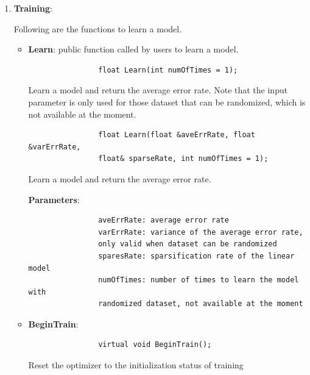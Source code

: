 \documentclass[11pt,a4paper]{article}
\newlength{\wideitemsep}
\let\olditem\item
\renewcommand{\item}{\setlength{\itemsep}{\wideitemsep}\olditem}
\begin{document}
\begin{enumerate}
    \item \textbf{Training}:

        Following are the functions to learn a model.

        \begin{itemize}
            \item \textbf{Learn}: public function called by users to learn a
                model.
                \lstset{language=C++,
                    framexleftmargin=-2.8cm,
                    xleftmargin=-2.8cm,
                }
                \begin{lstlisting}
                float Learn(int numOfTimes = 1);
                \end{lstlisting}

                Learn a model and return the average error rate. Note that the input
                parameter is only used for those dataset that can be randomized, which is
                not available at the moment.

                \lstset{language=C++}
                \begin{lstlisting}
                float Learn(float &aveErrRate, float &varErrRate, 
                float& sparseRate, int numOfTimes = 1);
                \end{lstlisting}

                Learn a model and return the average error rate.

                \textbf{Parameters}:


                \lstset{language=C++}
                \begin{lstlisting}
                aveErrRate: average error rate
                varErrRate: variance of the average error rate, 
                only valid when dataset can be randomized
                sparesRate: sparsification rate of the linear model
                numOfTimes: number of times to learn the model with 
                randomized dataset, not available at the moment
                \end{lstlisting}

            \item \textbf{BeginTrain}:
                \lstset{language=C++}
                \begin{lstlisting}
                virtual void BeginTrain();
                \end{lstlisting}

                Reset the optimizer to the initialization status of training


\end{itemize}
\end{enumerate}
\end{document}
